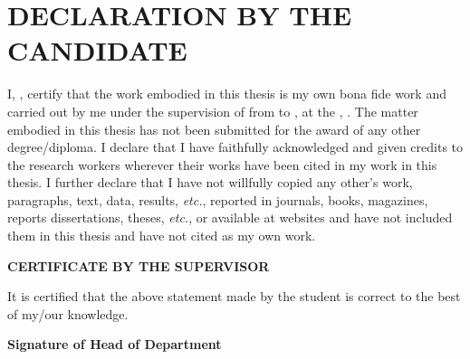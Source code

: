 \chapter*{\centering\normalsize DECLARATION BY THE CANDIDATE}

I, \textbf{\theauthor{}}, certify that the work embodied in this thesis is my own bona fide work and carried out by me under the supervision of \textbf{\supervisor{}} from \textbf{\projectstart{}} to \textbf{\projectend{}}, at the \textbf{\department{}}, \institute{}. The matter embodied in this thesis has not been submitted for the award of any other degree/diploma. I declare that I have faithfully acknowledged and given credits to the research workers wherever their works have been cited in my work in this thesis. I further declare that I have not willfully copied any other's work, paragraphs, text, data, results, \textit{etc.}, reported in journals, books, magazines, reports dissertations, theses, \textit{etc.}, or available at websites and have not included them in this thesis and have not cited as my own work.



\vspace{0.5cm}

\textbf{\centering CERTIFICATE BY THE SUPERVISOR\\}

\vspace{1cm}

It is certified that the above statement made by the student is correct to the best of my/our
knowledge.



\vfill

{\centering\textbf{Signature of Head of Department
\\}}
